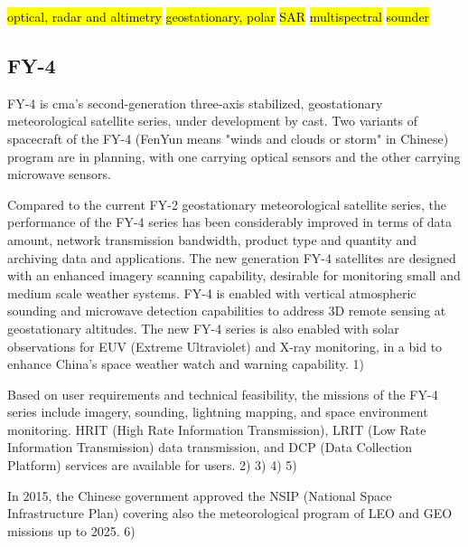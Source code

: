 \documentclass{article}
\begin{document}
\hl{optical, radar and altimetry}
\hl{geostationary, polar}
\hl{SAR}
\hl{multispectral}
\hl{sounder}

\subsection{FY-4}
\label{fy-4}

FY-4 is \ac{cma}'s second-generation three-axis stabilized, geostationary meteorological satellite series, under development by \ac{cast}. Two variants of spacecraft of the FY-4 (FenYun means "winds and clouds or storm" in Chinese) program are in planning, with one carrying optical sensors and the other carrying microwave sensors.

Compared to the current FY-2 geostationary meteorological satellite series, the performance of the FY-4 series has been considerably improved in terms of data amount, network transmission bandwidth, product type and quantity and archiving data and applications. The new generation FY-4 satellites are designed with an enhanced imagery scanning capability, desirable for monitoring small and medium scale weather systems. FY-4 is enabled with vertical atmospheric sounding and microwave detection capabilities to address 3D remote sensing at geostationary altitudes. The new FY-4 series is also enabled with solar observations for EUV (Extreme Ultraviolet) and X-ray monitoring, in a bid to enhance China's space weather watch and warning capability. 1)

Based on user requirements and technical feasibility, the missions of the FY-4 series include imagery, sounding, lightning mapping, and space environment monitoring. HRIT (High Rate Information Transmission), LRIT (Low Rate Information Transmission) data transmission, and DCP (Data Collection Platform) services are available for users. 2) 3) 4) 5)

In 2015, the Chinese government approved the NSIP (National Space Infrastructure Plan) covering also the meteorological program of LEO and GEO missions up to 2025. 6)
\end{document}
